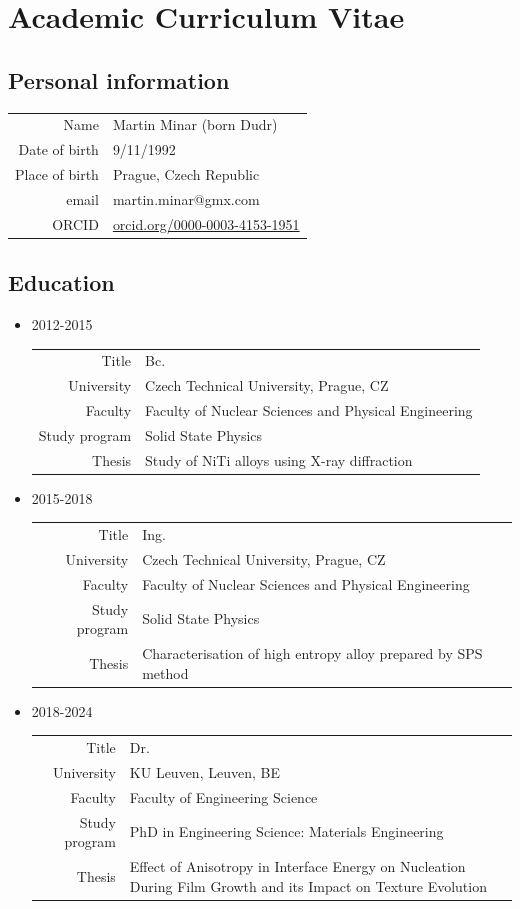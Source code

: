\chapter{Academic Curriculum Vitae}\label{ch:curriculum}
\section*{Personal information}

	\begin{tabular}{rl}
		Name           & Martin Minar (born Dudr) \\
		Date of birth  & 9/11/1992                \\
		Place of birth & Prague, Czech Republic   \\
		email          & martin.minar@gmx.com    \\
		ORCID 		    & \url{orcid.org/0000-0003-4153-1951}
	\end{tabular}


\section*{Education}
\begin{itemize}
	\item 2012-2015\\
		\begin{tabular}{rp{8cm}}
			Title & Bc. \\
			University           & Czech Technical University, Prague, CZ \\
			Faculty  & Faculty of Nuclear Sciences and Physical Engineering\\
			Study program  & Solid State Physics\\
			Thesis          & Study of NiTi alloys using X-ray diffraction  
		\end{tabular}
	\item 2015-2018 \\
		\begin{tabular}{rp{8cm}}
			Title & Ing. \\
			University           & Czech Technical University, Prague, CZ \\
			Faculty  & Faculty of Nuclear Sciences and Physical Engineering\\
			Study program  & Solid State Physics\\
			Thesis          & Characterisation of high entropy alloy prepared by SPS method
		\end{tabular}
	\item 2018-2024 \\
		\begin{tabular}{rp{8cm}}
			Title & Dr. \\
			University           & KU Leuven, Leuven, BE \\
			Faculty  & Faculty of Engineering Science\\
			Study program  & PhD in Engineering Science: Materials Engineering\\
			Thesis          & Effect of Anisotropy in Interface Energy on Nucleation During Film Growth and its Impact on Texture Evolution
		\end{tabular}
\end{itemize}

